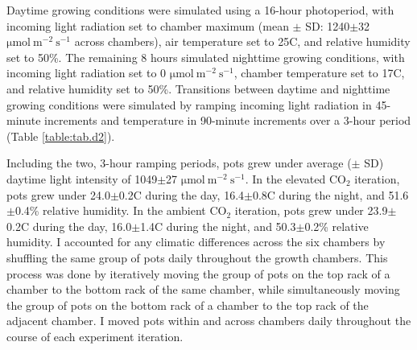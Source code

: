 Daytime growing conditions were simulated using a 16-hour photoperiod, with incoming light radiation set to chamber maximum (mean $\pm$ SD: 1240$\pm$32 $\mathrm{\mu mol\ m^{-2}\ s^{-1}}$ across chambers), air temperature set to 25\textdegree{}C, and relative humidity set to 50\%. The remaining 8 hours simulated nighttime growing conditions, with incoming light radiation set to 0 $\mathrm{\mu mol\ m^{-2}\ s^{-1}}$, chamber temperature set to 17\textdegree{}C, and relative humidity set to 50\%. Transitions between daytime and nighttime growing conditions were simulated by ramping incoming light radiation in 45-minute increments and temperature in 90-minute increments over a 3-hour period (Table \ref{table:tab.d2}).
    
Including the two, 3-hour ramping periods, pots grew under average ($\pm$ SD) daytime light intensity of 1049$\pm$27 $\mathrm{\mu mol\ m^{-2}\ s^{-1}}$. In the elevated CO$_2$ iteration, pots grew under 24.0$\pm$0.2\textdegree{}C during the day, 16.4$\pm$0.8\textdegree{}C during the night, and 51.6$\pm$0.4\% relative humidity. In the ambient CO$_2$ iteration, pots grew under 23.9$\pm$0.2\textdegree{}C during the day, 16.0$\pm$1.4\textdegree{}C during the night, and 50.3$\pm$0.2\% relative humidity. I accounted for any climatic differences across the six chambers by shuffling the same group of pots daily throughout the growth chambers. This process was done by iteratively moving the group of pots on the top rack of a chamber to the bottom rack of the same chamber, while simultaneously moving the group of pots on the bottom rack of a chamber to the top rack of the adjacent chamber. I moved pots within and across chambers daily throughout the course of each experiment iteration.

